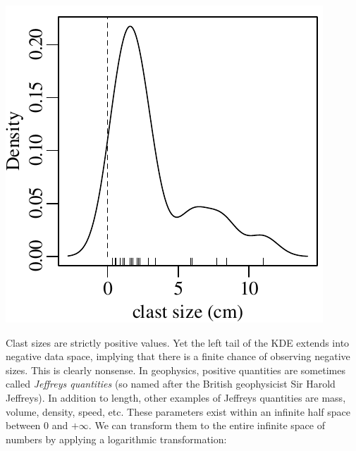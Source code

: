 \noindent\begin{minipage}[t][][b]{.3\textwidth}
  \includegraphics[width=\textwidth]{../figures/negativeKDE.pdf}\medskip
\end{minipage}
\begin{minipage}[t][][t]{.7\textwidth}
  \label{fig:negativeKDE}
\end{minipage}

Clast sizes are strictly positive values. Yet the left tail of the KDE
extends into negative data space, implying that there is a finite
chance of observing negative sizes.  This is clearly nonsense.  In
geophysics, positive quantities are sometimes called \emph{Jeffreys
  quantities} (so named after the British geophysicist Sir Harold
Jeffreys). In addition to length, other examples of Jeffreys
quantities are mass, volume, density, speed, etc. These parameters
exist within an infinite half space between 0 and $+\infty$. We can
transform them to the entire infinite space of numbers by applying a
logarithmic transformation:\medskip


